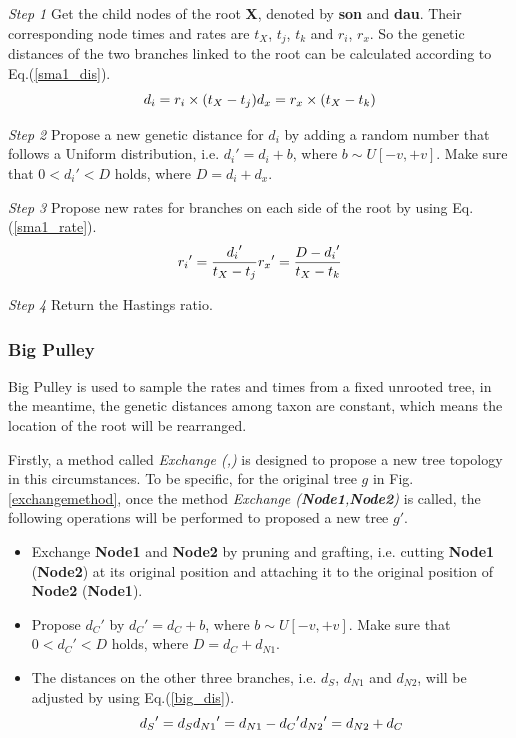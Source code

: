\documentclass{bmcart}
\begin{document}
\emph{Step 1} Get the child nodes of the root \textbf{X}, denoted by \textbf{son} and \textbf{dau}. Their corresponding node times and rates are $t_X$, $t_j$, $t_k$ and $r_i$, $r_x$. So the genetic distances of the two branches linked to the root can be calculated according to Eq.(\ref{sma1_dis}).
\begin{equation}
\label{sma1_dis}
{d_i} = {r_i} \times ({{t_X} - {t_j}})\\
{d_x} = {r_x} \times ({{t_X} - {t_k}})
 \end{equation}

\emph{Step 2} Propose a new genetic distance for $d_i$ by adding a random number that follows a Uniform distribution, i.e.  ${d_i}' = {d_i} + b$, where $b \sim U[ - v, + v]$. Make sure that $0 < {d_i}' < D$ holds, where $D = {d_i} + {d_x}$.

\emph{Step 3} Propose new rates for branches on each side of the root by using Eq.(\ref{sma1_rate}).
\begin{equation}
\label{sma1_rate}
{r_i}' = \frac{{{d_i}'}}{{{t_X} - {t_j}}}\\
{r_x}' = \frac{{D - {d_i}'}}{{{t_X} - {t_k}}}
 \end{equation}

\emph{Step 4} Return the Hastings ratio.
\subsubsection*{Big Pulley}
Big Pulley is used to sample the rates and times from a fixed unrooted tree, in the meantime, the genetic distances among taxon are constant, which means the location of the root will be rearranged.

Firstly, a method called \textit{Exchange (,)} is designed to propose a new tree topology in this circumstances. To be specific, for the original tree $g$ in Fig.\ref{exchangemethod}, once the method \textit{Exchange (\textbf{Node1},\textbf{Node2})} is called, the following operations will be performed to proposed a new tree $g'$.
\begin{itemize}
\item Exchange \textbf{Node1} and \textbf{Node2} by pruning and grafting, i.e. cutting \textbf{Node1} (\textbf{Node2}) at its original position and attaching it to the original position of \textbf{Node2} (\textbf{Node1}).
\item Propose ${d_C}'$ by ${d_C}' = {d_C} + b$, where $b \sim U[ - v, + v]$. Make sure that $0 < {d_C}' < D$ holds, where $D = {d_C} + {d_{N1}}$.
\item The distances on the other three branches, i.e. $d_S$, $d_{N1}$ and $d_{N2}$, will be adjusted by using Eq.(\ref{big_dis}).
\begin{equation}\label{big_dis}
{d_S}' = {d_S}\\
{d_{N1}}' = {d_{N1}} - {d_C}'\\
{d_{N2}}' = {d_{N2}} + {d_C}
\end{equation}
\end{itemize}
\end{document}
